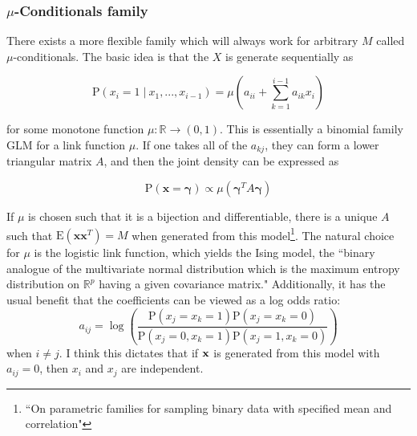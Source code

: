 \documentclass[11pt]{article}
\newcommand{\R}{\mathbb{R}}
\newcommand{\p}{\mathrm{P}}
\newcommand{\E}{\mathrm{E}}
\newcommand{\st}{ \; \big | \:}
\theoremstyle{definition}
\begin{document}
\subsubsection{$\mu$-Conditionals family}
    There exists a more flexible family which will always work for arbitrary $M$ called $\mu$-conditionals. The basic idea is that the $X$ is generate sequentially as 

    \[ \p(x_{i}=1\st x_{1},...,x_{i-1}) = \mu\left(a_{ii}+\sum_{k=1}^{i-1}a_{ik}x_i\right) \]

    for some monotone function $\mu:\R\to(0,1)$. This is essentially a binomial family GLM for a link function $\mu$. If one takes all of the $a_{kj}$, they can form a lower triangular matrix $A$, and then the joint density can be expressed as 

    \[ \p(\mathbf x=\mathbf \gamma) \propto \mu(\mathbf{\gamma}^T A\mathbf \gamma)\]

    If $\mu$ is chosen such that it is a bijection and differentiable, there is a unique $A$ such that $\E(\mathbf x \mathbf x^T)=M$ when generated from this model\footnote{``On parametric families for sampling binary data with specified mean and correlation"}. The natural choice for $\mu$ is the logistic link function, which yields the Ising model, the ``binary analogue of the multivariate normal distribution which is the maximum entropy distribution on $\R^p$ having a given covariance matrix." Additionally, it has the usual benefit that the coefficients can be viewed as a log odds ratio:
    \[a_{ij} = \log\left(\frac{\p(x_j=x_k=1)\p(x_j=x_k=0)}{\p(x_j=0,x_k=1)\p(x_j=1,x_k=0)}\right) \]
    when $i\neq j$. I think this dictates that if $\bf x$ is generated from this model with $a_{ij}=0$, then $x_i$ and $x_j$ are independent.  \par
\end{document}

